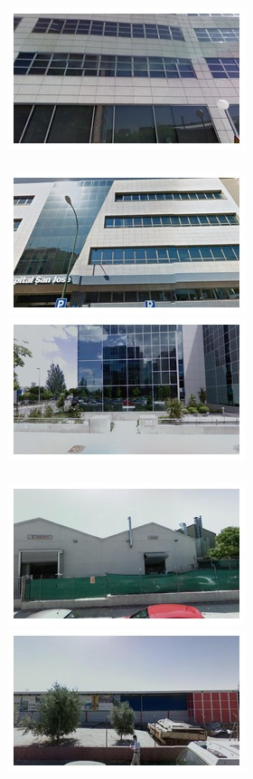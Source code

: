 \begin{figure}[t]
\begin{minipage}{\linewidth}
\begin{minipage}{0.3\linewidth}
      \includegraphics[width=0.49\linewidth]{imgs/arch/mosaicsS4/mosaic0012.jpg}
      \\ \vspace{-3mm} \\
      \includegraphics[width=0.49\linewidth]{imgs/arch/mosaicsS4/mosaic0014.jpg}
      \includegraphics[width=0.49\linewidth]{imgs/arch/mosaicsS4/mosaic0018.jpg}
      \\ \vspace{-3mm} \\
      \includegraphics[width=0.49\linewidth]{imgs/arch/mosaicsS4/mosaic0019.jpg}
      \includegraphics[width=0.49\linewidth]{imgs/arch/mosaicsS4/mosaic0021.jpg}

\end{minipage}
\end{minipage}
\end{figure}
